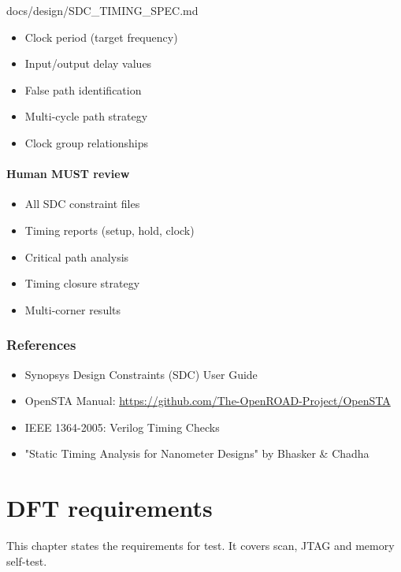 \begin{relocated}{docs/design/SDC_TIMING_SPEC.md}
\begin{itemize}
\tightlist
\item
  Clock period (target frequency)
\item
  Input/\allowbreak{}output delay values
\item
  False path identification
\item
  Multi-cycle path strategy
\item
  Clock group relationships
\end{itemize}

\subsubsection{Human MUST review}\label{ds:ch:sdc-timing-spec:human-must-review}

\begin{itemize}
\tightlist
\item
  All SDC constraint files
\item
  Timing reports (setup, hold, clock)
\item
  Critical path analysis
\item
  Timing closure strategy
\item
  Multi-corner results
\end{itemize}

\subsection{References}\label{ds:ch:sdc-timing-spec:references}

\begin{itemize}
\tightlist
\item
  Synopsys Design Constraints (SDC) User Guide
\item
  OpenSTA Manual:
  \href{https://github.com/The-OpenROAD-Project/OpenSTA}{https:/\allowbreak{}/\allowbreak{}github.com/\allowbreak{}The-OpenROAD-Project/\allowbreak{}OpenSTA}
\item
  IEEE 1364-2005: Verilog Timing Checks
\item
  "Static Timing Analysis for Nanometer Designs" by Bhasker \& Chadha
\end{itemize}
\end{relocated}



\chapter{DFT requirements}\label{ds:ch:dft-requirements}

This chapter states the requirements for test. It covers scan, JTAG and memory self-test.
